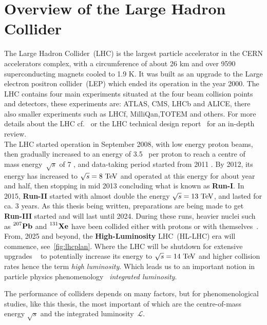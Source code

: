 \section{Overview of the Large Hadron Collider \label{sec:theLHC}}
\par The Large Hadron Collider~(LHC) is the largest particle accelerator in the CERN accelerators complex, with a circumference of about 26 \si{\kilo\metre} and over 9590 superconducting magnets cooled to 1.9 \si{\kelvin}. It was built as an upgrade to the Large electron positron collider~(LEP) which ended its operation in the year 2000. The LHC contains four main experiments situated at the four beam collision points and detectors, these experiments are: ATLAS, CMS, LHCb and ALICE, there also smaller experiments such as LHCf, MilliQan,TOTEM and others. For more details about the LHC cf.~\cite{cernfacts,welt-machine} or the LHC technical design report~\cite{Bruning:2004ej} for an in-depth review.\\   The LHC started operation in September 2008, with low energy proton beams, then gradually increased to an energy of 3.5 \TeV\ per proton to reach a centre of mass energy~$\sqrt{s}$ of 7 \TeV, and data-taking period started from 2011 . By 2012, its energy has increased to $\sqrt{s}= 8\ \TeV$ and operated at this energy for about year and half, then stopping in mid 2013 concluding what is known as \textbf{Run-I}. In 2015,  \textbf{Run-II} started with almost double the energy $\sqrt{s}= 13\ \TeV$, and lasted for ca. 3 years. As this thesis being written, preparations are being made to get \textbf{Run-III} started and will last until 2024. During these runs, heavier nuclei such as $\prescript{207}{}{\mathbf{Pb}}$ and $\prescript{131}{}{\mathbf{Xe}}$ have been collided either with protons or with themselves~\cite{lhckomission}.  \\  From, 2025 and beyond, the \textbf{High-Luminosity} LHC~(HL-LHC) era will commence, see~\autoref{fig:lhcplan}.   Where the LHC will be shutdown for extensive upgrades ~\cite{Apollinari:2015bam} to potentially increase its energy to  $\sqrt{s}= 14\ \TeV$ and higher collision rates hence the term \emph{high luminosity}. Which leads us to an important notion in particle physics phenomenology ~\emph{integrated luminosity}.\\
\par The performance of colliders depends on many factors, but for phenomenological studies, like this thesis, the most important of which are the centre-of-mass energy $\sqrt{s}$ and the integrated luminosity~$\mathscr{L}$.
